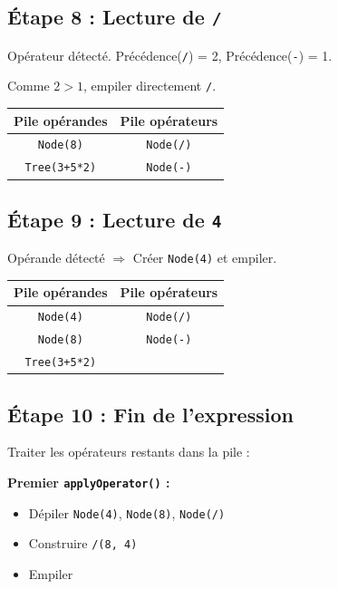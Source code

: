 \documentclass[12pt,a4paper]{article}
\begin{document}
\subsection{Étape 8 : Lecture de \texttt{/}}

Opérateur détecté. Précédence(\texttt{/}) = 2, Précédence(\texttt{-}) = 1.

Comme $2 > 1$, empiler directement \texttt{/}.

\begin{center}
\begin{tabular}{|c|c|}
\hline
\textbf{Pile opérandes} & \textbf{Pile opérateurs} \\
\hline
\texttt{Node(8)} & \texttt{Node(/)} \\
\texttt{Tree(3+5*2)} & \texttt{Node(-)} \\
\hline
\end{tabular}
\end{center}

\subsection{Étape 9 : Lecture de \texttt{4}}

Opérande détecté $\Rightarrow$ Créer \texttt{Node(4)} et empiler.

\begin{center}
\begin{tabular}{|c|c|}
\hline
\textbf{Pile opérandes} & \textbf{Pile opérateurs} \\
\hline
\texttt{Node(4)} & \texttt{Node(/)} \\
\texttt{Node(8)} & \texttt{Node(-)} \\
\texttt{Tree(3+5*2)} & \\
\hline
\end{tabular}
\end{center}

\subsection{Étape 10 : Fin de l'expression}

Traiter les opérateurs restants dans la pile :

\textbf{Premier \texttt{applyOperator()} :}
\begin{itemize}
    \item Dépiler \texttt{Node(4)}, \texttt{Node(8)}, \texttt{Node(/)}
    \item Construire \texttt{/(8, 4)}
    \item Empiler
\end{itemize}
\end{document}
